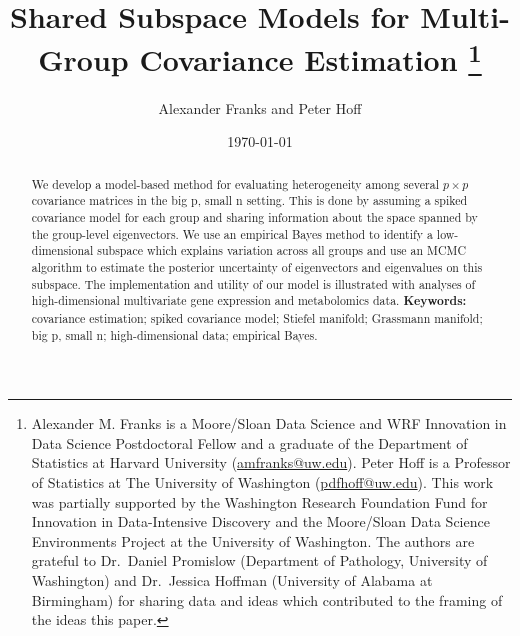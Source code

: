 \documentclass[12pt]{article}
\begin{document}
\title{Shared Subspace Models for Multi-Group Covariance Estimation
%
  \protect\thanks{Alexander M. Franks is a Moore/Sloan Data Science
    and WRF Innovation in Data Science Postdoctoral Fellow and a
    graduate of the Department of Statistics at Harvard University
    (\href{mailto:amfranks@uw.edu}{amfranks@uw.edu}).  Peter Hoff is a
    Professor of Statistics at The University of Washington
    (\href{mailto:pdhoff@uw.edu}{pdfhoff@uw.edu}).
%
This work was partially supported 
 by the Washington Research Foundation Fund for Innovation in Data-Intensive Discovery and the Moore/Sloan Data Science Environments Project at the University of Washington.
%
 The authors are grateful to Dr.\ Daniel Promislow (Department of
 Pathology, University of Washington) and Dr.\ Jessica Hoffman
 (University of Alabama at Birmingham) for sharing data and ideas
 which contributed to the framing of the ideas this paper.}}
\author{Alexander Franks and Peter Hoff} \date{\today}
\maketitle 

\begin{abstract}


  We develop a model-based method for evaluating heterogeneity among
  several $p\times p$ covariance matrices in the big p, small n setting.
  This is done by assuming a spiked covariance model for each group
  and sharing information about the space spanned by the group-level
  eigenvectors.  We use an empirical Bayes method to identify a low-dimensional
  subspace which explains variation across all groups and use an MCMC
  algorithm to estimate the posterior uncertainty of eigenvectors and
  eigenvalues on this subspace.  The implementation and utility of our
  model is illustrated with analyses of high-dimensional multivariate
  gene expression and metabolomics data.
\vfill
\noindent\textbf{Keywords:} covariance estimation; spiked covariance
model; Stiefel manifold; Grassmann manifold; big p, small n;
high-dimensional data; empirical Bayes.
\end{abstract}
\end{document}
